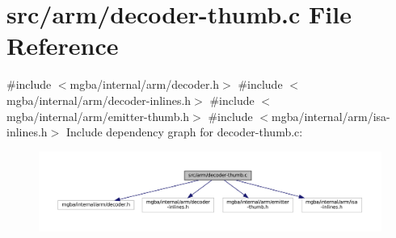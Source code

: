 \hypertarget{decoder-thumb_8c}{}\section{src/arm/decoder-\/thumb.c File Reference}
\label{decoder-thumb_8c}
{\ttfamily \#include $<$mgba/internal/arm/decoder.\+h$>$}\newline
{\ttfamily \#include $<$mgba/internal/arm/decoder-\/inlines.\+h$>$}\newline
{\ttfamily \#include $<$mgba/internal/arm/emitter-\/thumb.\+h$>$}\newline
{\ttfamily \#include $<$mgba/internal/arm/isa-\/inlines.\+h$>$}\newline
Include dependency graph for decoder-\/thumb.c\+:
\nopagebreak
\begin{figure}[H]
\begin{center}
\leavevmode
\includegraphics[width=350pt]{decoder-thumb_8c__incl}
\end{center}
\end{figure}
